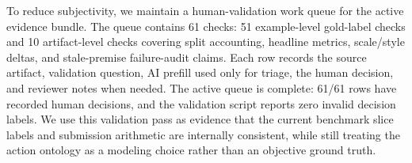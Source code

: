 To reduce subjectivity, we maintain a human-validation work queue for the active evidence bundle. The queue contains 61 checks: 51 example-level gold-label checks and 10 artifact-level checks covering split accounting, headline metrics, scale/style deltas, and stale-premise failure-audit claims. Each row records the source artifact, validation question, AI prefill used only for triage, the human decision, and reviewer notes when needed. The active queue is complete: 61/61 rows have recorded human decisions, and the validation script reports zero invalid decision labels. We use this validation pass as evidence that the current benchmark slice labels and submission arithmetic are internally consistent, while still treating the action ontology as a modeling choice rather than an objective ground truth.
